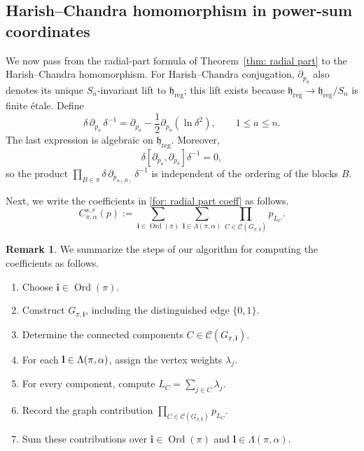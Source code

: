 \documentclass[11pt,reqno]{amsart}
\theoremstyle{definition}
\newtheorem{remark}[theorem]{Remark}
\newcommand{\fkh}{\mathfrak{h}}
\newcommand{\reg}{\mathrm{reg}}
\newcommand{\bfl}{\mathbf{l}}
\newcommand{\Ord}{\operatorname{Ord}}
\newcommand{\mC}{\mathcal{C}}
\newcommand{\bfi}{\mathbf{i}}
\begin{document}
\subsection{Harish--Chandra homomorphism in power-sum coordinates}
\label{subsec: hc power sum formula}



We now pass from the radial-part formula of Theorem~\ref{thm: radial part} to the Harish--Chandra homomorphism.
For Harish--Chandra conjugation, \(\partial_{p_a}\) also denotes its
unique \(S_n\)-invariant lift to \(\fkh_{\reg}\); this lift exists
because \(\fkh_{\reg}\to\fkh_{\reg}/S_n\) is finite étale.  Define
\[
\delta\,\partial_{p_a}\,\delta^{-1}
=
\partial_{p_a}-\frac{1}{2}\partial_{p_a}(\ln\delta^2),
\qquad 1\leq a\leq n.
\]
The last expression is algebraic on \(\fkh_{\reg}\).  Moreover,
\[
\delta[\partial_{p_a},\partial_{p_b}]\delta^{-1}
=0,
\]
so the product
\(\prod_{B\in\pi}\delta\,\partial_{p_{\alpha(B)}}\,\delta^{-1}\)
is independent of the ordering of the blocks \(B\).



Next, we write the coefficients in \eqref{for: radial part coeff} as follows.
\begin{equation}\label{eq:C-pi-alpha-def-hc}
   C_{\pi,\alpha}^{s,r}(p)
   :=
   \sum_{\bfi\in\Ord(\pi)}
   \sum_{\bfl\in\Lambda(\pi,\alpha)}
   \prod_{C\in\mC(G_{\pi,\bfi})}p_{L_C}.
\end{equation}

\begin{remark}\label{rmk: algorithm for coeff}
We summarize the steps of our algorithm for computing the coefficients as follows.
\begin{enumerate}
\item Choose \(\bfi\in\Ord(\pi)\).
\item Construct \(G_{\pi,\bfi}\), including the distinguished edge
      \(\{0,1\}\).
\item Determine the connected components
      \(C\in\mC(G_{\pi,\bfi})\).
\item For each \({\bf l} \in \Lambda (\pi, \alpha)\),
	assign the vertex weights \(\lambda_j\).
\item For every component, compute
      \(L_C=\sum_{j\in C}\lambda_j\).
\item Record the graph contribution
      \(\prod_{C\in\mC(G_{\pi,\bfi})}p_{L_C}\).
\item Sum these contributions over
      \(\bfi\in\Ord(\pi)\) and
      \(\bfl\in\Lambda(\pi,\alpha)\).
\end{enumerate}
\end{remark}
\end{document}
